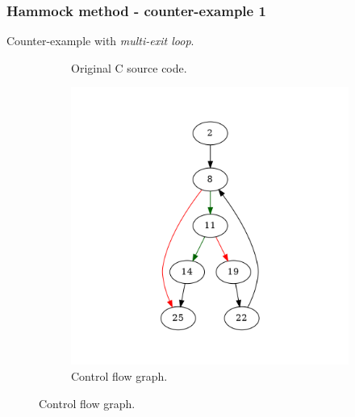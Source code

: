 \documentclass[aspectratio=1610]{beamer}
\begin{document}
\begin{frame}
	\frametitle{Hammock method - counter-example 1}
	Counter-example with \textit{multi-exit loop}.
	\begin{figure}[htbp]
		\centering
		\begin{subfigure}[b]{0.30\textwidth}
			\centering
			
			\caption{Original C source code.}
		\end{subfigure}
		\begin{subfigure}[b]{0.50\textwidth}
			\centering
			\includegraphics[height=0.6\paperheight]{inc/methods/hammock/counter-example/with-break/main.png}
			\caption{Control flow graph.}
		\end{subfigure}
	\end{figure}
\end{frame}
\end{document}
